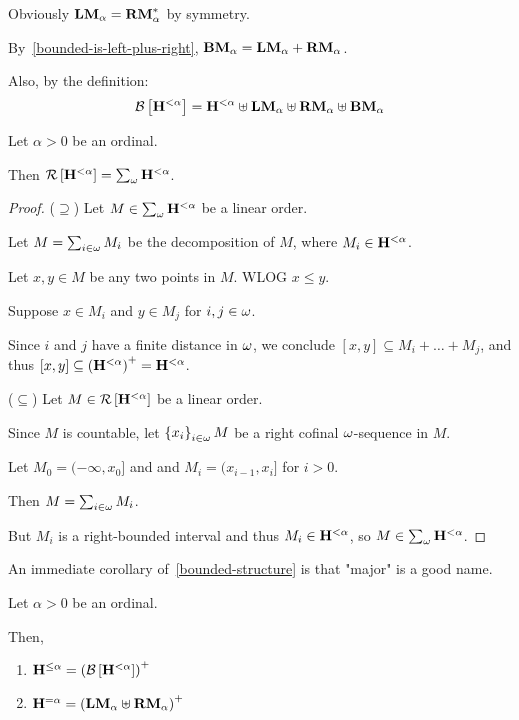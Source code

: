 \begin{note}
  Obviously $\mathbf{LM}_{\alpha} = \mathbf{RM}_{\alpha}^\ast$ by symmetry.

  By~\cref{bounded-is-left-plus-right}, $\mathbf{BM}_{\alpha} = \mathbf{LM}_{\alpha} + \mathbf{RM}_{\alpha}$.

  Also, by the definition:
  \[
    \mathcal{B} \left[ {\mathbf{H}_{}^{< \alpha}} \right] = \mathbf{H}_{}^{< \alpha} \uplus \mathbf{LM}_{\alpha}
    \uplus \mathbf{RM}_{\alpha} \uplus \mathbf{BM}_{\alpha}
  \]
\end{note}

\begin{lemma}\label{bounded-structure}
  Let $\alpha > 0$ be an ordinal.

  Then $\mathcal{R} \left[ {\mathbf{H}_{}^{< \alpha}} \right] = \sum_{\omega}{\mathbf{H}_{}^{< \alpha}}$.
\end{lemma}

\begin{proof}
  ($\supseteq$) Let $M \in \sum_{\omega}{\mathbf{H}_{}^{< \alpha}}$ be a linear order.

  Let $M = \sum_{i \in \omega} M_i$ be the decomposition of $M$,
  where $M_i \in \mathbf{H}_{}^{< \alpha}$.

  Let $x, y \in M$ be any two points in $M$. WLOG $x \le y$.

  Suppose $x \in M_i$ and $y \in M_j$ for $i, j \in \omega$.

  Since $i$ and $j$ have a finite distance in $\omega$,
  we conclude $[x, y] \subseteq M_i + \ldots + M_j$,
  and thus $[x, y] \subseteq \left( {\mathbf{H}_{}^{< \alpha}} \right)^+ = \mathbf{H}_{}^{< \alpha}$.

  ($\subseteq$) Let $M \in \mathcal{R} \left[ {\mathbf{H}_{}^{< \alpha}} \right]$ be a linear order.

  Since $M$ is countable, let $\left\{ {x_i} \right\}_{i \in \omega} M$ be a right cofinal
  $\omega$-sequence in $M$.

  Let $M_0 = (-\infty, x_0]$ and and $M_i = (x_{i-1}, x_{i}]$ for $i > 0$.

  Then $M = \sum_{i \in \omega} M_i$.

  But $M_i$ is a right-bounded interval and thus $M_i \in \mathbf{H}_{}^{< \alpha}$, so $M \in \sum_{\omega}{\mathbf{H}_{}^{< \alpha}}$.
\end{proof}

An immediate corollary of~\cref{bounded-structure} is that "major" is a good name.
\begin{corollary}\label{le-alpha-corollary}
  Let $\alpha > 0$ be an ordinal.

  Then,
  \begin{enumerate}
    \item $\mathbf{H}_{}^{\le \alpha} = \left( {\mathcal{B} \left[ {\mathbf{H}_{}^{< \alpha}} \right]} \right)^+$
    \item $\mathbf{H}_{}^{= \alpha} = \left( { \mathbf{LM}_{\alpha} \uplus \mathbf{RM}_{\alpha} } \right)^+$
  \end{enumerate}
\end{corollary}

